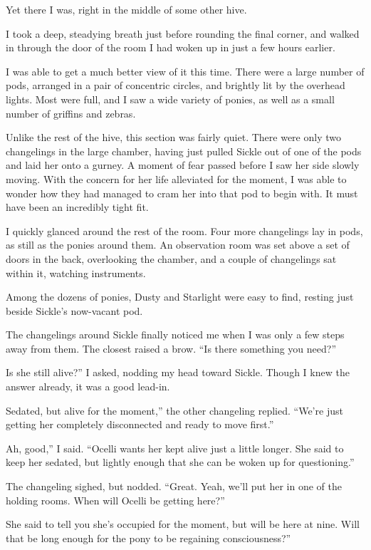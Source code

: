 Yet there I was, right in the middle of some other hive.

I took a deep, steadying breath just before rounding the final corner, and walked in through the door of the room I had woken up in just a few hours earlier.

I was able to get a much better view of it this time. There were a large number of pods, arranged in a pair of concentric circles, and brightly lit by the overhead lights. Most were full, and I saw a wide variety of ponies, as well as a small number of griffins and zebras.

Unlike the rest of the hive, this section was fairly quiet. There were only two changelings in the large chamber, having just pulled Sickle out of one of the pods and laid her onto a gurney. A moment of fear passed before I saw her side slowly moving. With the concern for her life alleviated for the moment, I was able to wonder how they had managed to cram her into that pod to begin with. It must have been an incredibly tight fit.

I quickly glanced around the rest of the room. Four more changelings lay in pods, as still as the ponies around them. An observation room was set above a set of doors in the back, overlooking the chamber, and a couple of changelings sat within it, watching instruments.

Among the dozens of ponies, Dusty and Starlight were easy to find, resting just beside Sickle’s now-vacant pod.

The changelings around Sickle finally noticed me when I was only a few steps away from them. The closest raised a brow. “Is there something you need?”

\leavevmode{}Is she still alive?” I asked, nodding my head toward Sickle. Though I knew the answer already, it was a good lead-in.

\leavevmode{}Sedated, but alive for the moment,” the other changeling replied. “We’re just getting her completely disconnected and ready to move first.”

\leavevmode{}Ah, good,” I said. “Ocelli wants her kept alive just a little longer. She said to keep her sedated, but lightly enough that she can be woken up for questioning.”

The changeling sighed, but nodded. “Great. Yeah, we’ll put her in one of the holding rooms. When will Ocelli be getting here?”

\leavevmode{}She said to tell you she’s occupied for the moment, but will be here at nine. Will that be long enough for the pony to be regaining consciousness?”

